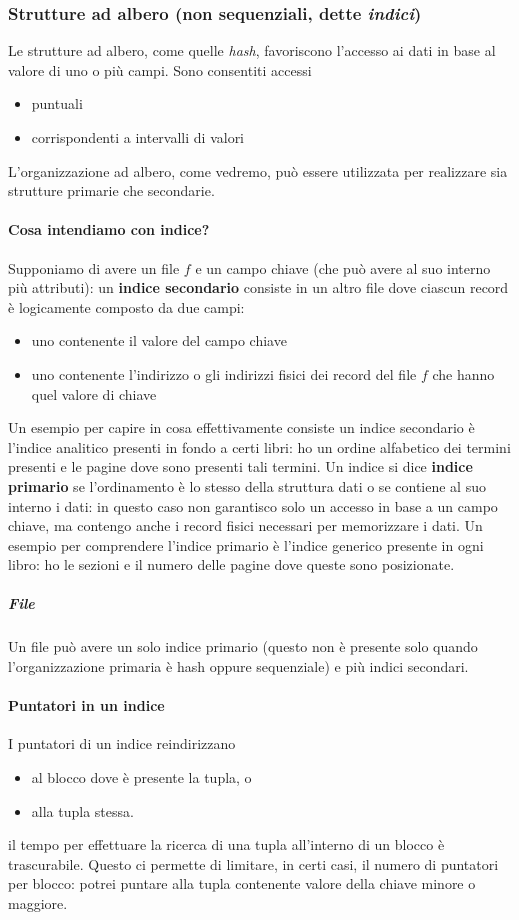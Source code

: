\subsubsection{Strutture ad albero (non sequenziali, dette \emph{indici})} Le strutture ad albero, come quelle \emph{hash}, favoriscono l'accesso ai dati in base al valore di uno o più campi. Sono consentiti accessi
\begin{itemize}
	\item puntuali
	\item corrispondenti a intervalli di valori
\end{itemize}
L'organizzazione ad albero, come vedremo, può essere utilizzata per realizzare sia strutture primarie che secondarie.

\paragraph{Cosa intendiamo con indice?} Supponiamo di avere un file $f$ e un campo chiave (che può avere al suo interno più attributi): un \textbf{indice secondario} consiste in un altro file dove ciascun record è logicamente composto da due campi:
\begin{itemize}
	\item uno contenente il valore del campo chiave
	\item uno contenente l'indirizzo o gli indirizzi fisici dei record del file $f$ che hanno quel valore di chiave
\end{itemize}
Un esempio per capire in cosa effettivamente consiste un indice secondario è l'indice analitico presenti in fondo a certi libri: ho un ordine alfabetico dei termini presenti e le pagine dove sono presenti tali termini. Un indice si dice \textbf{indice primario} se l'ordinamento è lo stesso della struttura dati o se contiene al suo interno i dati: in questo caso non garantisco solo un accesso in base a un campo chiave, ma contengo anche i record fisici necessari per memorizzare i dati. Un esempio per comprendere l'indice primario è l'indice generico presente in ogni libro: ho le sezioni e il numero delle pagine dove queste sono posizionate.
\subparagraph{File} Un file può avere un solo indice primario (questo non è presente solo quando l'organizzazione primaria è hash oppure sequenziale) e più indici secondari.
\paragraph{Puntatori in un indice} I puntatori di un indice reindirizzano
\begin{itemize}
	\item al blocco dove è presente la tupla, o
	\item alla tupla stessa.
\end{itemize}
il tempo per effettuare la ricerca di una tupla all'interno di un blocco è trascurabile. Questo ci permette di limitare, in certi casi, il numero di puntatori per blocco: potrei puntare alla tupla contenente valore della chiave minore o maggiore.
